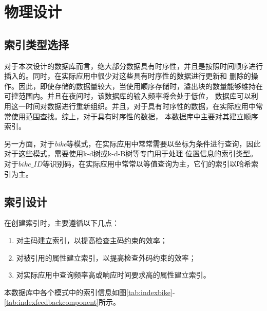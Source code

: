 \section{物理设计}\label{sec:physics}
\subsection{索引类型选择}
对于本次设计的数据库而言，绝大部分数据具有时序性，并且是按照时间顺序进行插入的。同时，在实际应用中很少对这些具有时序性的数据进行更新和
删除的操作。因此，即使存储的数据量较大，当使用顺序存储时，溢出块的数量能够维持在可控范围内。并且在夜间时，该数据库的输入频率将会处于低位，
数据库可以利用这一时间对数据进行重新组织。并且，对于具有时序性的数据，在实际应用中常常使用范围查找。综上，对于具有时序性的数据，
本数据库中主要对其建立顺序索引。

另一方面，对于\textit{bike}等模式，在实际应用中常常需要以坐标为条件进行查询，因此对于这些模式，需要使用k-d树或k-d-B树等专门用于处理
位置信息的索引类型。对于$bike\_ID$等识别码，在实际应用中常常以等值查询为主，它们的索引以哈希索引为主。
\subsection{索引设计}
在创建索引时，主要遵循以下几点：
\begin{enumerate}
  \item 对主码建立索引，以提高检查主码约束的效率；
  \item 对被引用的属性建立索引，以提高检查外码约束的效率；
  \item 对实际应用中查询频率高或响应时间要求高的属性建立索引。
\end{enumerate}

本数据库中各个模式中的索引信息如图\ref{tab:indexbike}-\ref{tab:indexfeedbackcomponent}所示。

